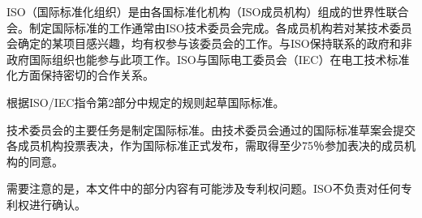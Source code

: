 ISO（国际标准化组织）是由各国标准化机构（ISO成员机构）组成的世界性联合会。制定国际标准的工作通常由ISO技术委员会完成。各成员机构若对某技术委员会确定的某项目感兴趣，均有权参与该委员会的工作。与ISO保持联系的政府和非政府国际组织也能参与此项工作。ISO与国际电工委员会（IEC）在电工技术标准化方面保持密切的合作关系。

根据ISO/IEC指令第2部分中规定的规则起草国际标准。

技术委员会的主要任务是制定国际标准。由技术委员会通过的国际标准草案会提交各成员机构投票表决，作为国际标准正式发布，需取得至少75％参加表决的成员机构的同意。

需要注意的是，本文件中的部分内容有可能涉及专利权问题。ISO不负责对任何专利权进行确认。
